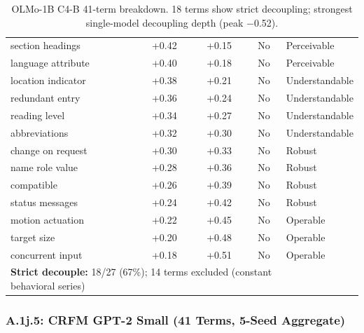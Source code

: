 \documentclass[10pt]{article} %
\begin{document}
\begin{table}[H]
\begin{tabular}{|l|c|c|c|l|}
section headings & +0.42 & +0.15 & No & Perceivable \\
language attribute & +0.40 & +0.18 & No & Perceivable \\
location indicator & +0.38 & +0.21 & No & Understandable \\
redundant entry & +0.36 & +0.24 & No & Understandable \\
reading level & +0.34 & +0.27 & No & Understandable \\
abbreviations & +0.32 & +0.30 & No & Understandable \\
change on request & +0.30 & +0.33 & No & Robust \\
name role value & +0.28 & +0.36 & No & Robust \\
compatible & +0.26 & +0.39 & No & Robust \\
status messages & +0.24 & +0.42 & No & Robust \\
motion actuation & +0.22 & +0.45 & No & Operable \\
target size & +0.20 & +0.48 & No & Operable \\
concurrent input & +0.18 & +0.51 & No & Operable \\
\hline
\multicolumn{4}{|l|}{\textbf{Strict decouple:} 18/27 (67\%); 14 terms excluded (constant behavioral series)} \\
\hline
\end{tabular}
\caption{OLMo-1B C4-B 41-term breakdown. 18 terms show strict decoupling; strongest single-model decoupling depth (peak $-$0.52).}
\end{table}

\subsubsection*{A.1j.5: CRFM GPT-2 Small (41 Terms, 5-Seed Aggregate)}
\end{document}
